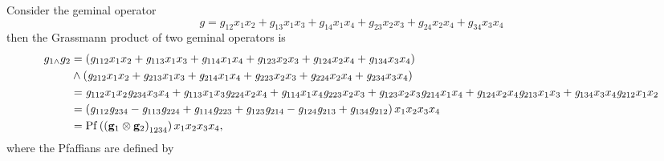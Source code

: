 \documentclass[aps,preprint]{revtex4}%
\begin{document}
Consider the geminal operator
\begin{equation}
g=\mathit{g}_{12}x_{1}x_{2}+\mathit{g}_{13}x_{1}x_{3}+\mathit{g}_{14}%
x_{1}x_{4}+\mathit{g}_{23}x_{2}x_{3}+\mathit{g}_{24}x_{2}x_{4}+\mathit{g}%
_{34}x_{3}x_{4}%
\end{equation}
then the Grassmann product of two geminal operators is
\begin{align}
g_{1{\Large \wedge}}g_{2}  &  =\left(  \mathit{g}_{112}x_{1}x_{2}%
+\mathit{g}_{113}x_{1}x_{3}+\mathit{g}_{114}x_{1}x_{4}+\mathit{g}_{123}%
x_{2}x_{3}+\mathit{g}_{124}x_{2}x_{4}+\mathit{g}_{134}x_{3}x_{4}\right) \\
&  \wedge\left(  \mathit{g}_{212}x_{1}x_{2}+\mathit{g}_{213}x_{1}%
x_{3}+\mathit{g}_{214}x_{1}x_{4}+\mathit{g}_{223}x_{2}x_{3}+\mathit{g}%
_{224}x_{2}x_{4}+\mathit{g}_{234}x_{3}x_{4}\right) \\
&  =\mathit{g}_{112}x_{1}x_{2}\mathit{g}_{234}x_{3}x_{4}+\mathit{g}_{113}%
x_{1}x_{3}\mathit{g}_{224}x_{2}x_{4}+\mathit{g}_{114}x_{1}x_{4}\mathit{g}%
_{223}x_{2}x_{3}+\mathit{g}_{123}x_{2}x_{3}\mathit{g}_{214}x_{1}%
x_{4}+\mathit{g}_{124}x_{2}x_{4}\mathit{g}_{213}x_{1}x_{3}+\mathit{g}%
_{134}x_{3}x_{4}\mathit{g}_{212}x_{1}x_{2}\\
&  =\left(  \mathit{g}_{112}\mathit{g}_{234}-\mathit{g}_{113}\mathit{g}%
_{224}+\mathit{g}_{114}\mathit{g}_{223}+\mathit{g}_{123}\mathit{g}%
_{214}-\mathit{g}_{124}\mathit{g}_{213}+\mathit{g}_{134}\mathit{g}%
_{212}\right)  x_{1}x_{2}x_{3}x_{4}\\
&  =\operatorname*{Pf}\left(  \left(  \mathbf{g}_{1}\otimes\mathbf{g}%
_{2}\right)  _{1234}\right)  x_{1}x_{2}x_{3}x_{4},
\end{align}
where the Pfaffians are defined by
\end{document}
